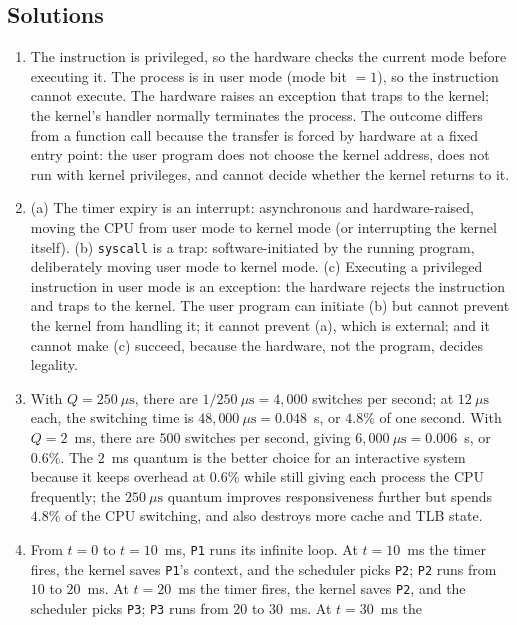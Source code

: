 \documentclass[11pt]{article}
\begin{document}
\subsection*{Solutions}
\begingroup\small
\begin{enumerate}
  \item The instruction is privileged, so the hardware checks the current mode
    before executing it. The process is in user mode (mode bit $=1$), so the
    instruction cannot execute. The hardware raises an exception that traps to
    the kernel; the kernel's handler normally terminates the process. The
    outcome differs from a function call because the transfer is forced by
    hardware at a fixed entry point: the user program does not choose the
    kernel address, does not run with kernel privileges, and cannot decide
    whether the kernel returns to it.
  \item (a) The timer expiry is an interrupt: asynchronous and hardware-raised,
    moving the CPU from user mode to kernel mode (or interrupting the kernel
    itself). (b) \texttt{syscall} is a trap: software-initiated by the running
    program, deliberately moving user mode to kernel mode. (c) Executing a
    privileged instruction in user mode is an exception: the hardware rejects
    the instruction and traps to the kernel. The user program can initiate (b)
    but cannot prevent the kernel from handling it; it cannot prevent (a),
    which is external; and it cannot make (c) succeed, because the hardware,
    not the program, decides legality.
  \item With $Q=250\ \mu\text{s}$, there are $1/250\ \mu\text{s}=4{,}000$
    switches per second; at $12\ \mu\text{s}$ each, the switching time is
    $48{,}000\ \mu\text{s}=0.048$~s, or $4.8\%$ of one second. With $Q=2$~ms,
    there are $500$ switches per second, giving
    $6{,}000\ \mu\text{s}=0.006$~s, or $0.6\%$. The $2$~ms quantum is the
    better choice for an interactive system because it keeps overhead at
    $0.6\%$ while still giving each process the CPU frequently; the
    $250\ \mu\text{s}$ quantum improves responsiveness further but spends
    $4.8\%$ of the CPU switching, and also destroys more cache and TLB state.
  \item From $t=0$ to $t=10$~ms, \texttt{P1} runs its infinite loop. At
    $t=10$~ms the timer fires, the kernel saves \texttt{P1}'s context, and the
    scheduler picks \texttt{P2}; \texttt{P2} runs from $10$ to $20$~ms. At
    $t=20$~ms the timer fires, the kernel saves \texttt{P2}, and the scheduler
    picks \texttt{P3}; \texttt{P3} runs from $20$ to $30$~ms. At $t=30$~ms the

\end{enumerate}
\end{document}
